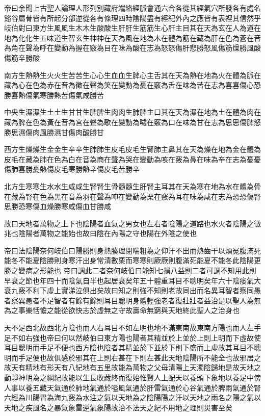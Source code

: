 帝曰余聞上古聖人論理人形列別藏府端絡經脈會通六合各從其經氣穴所發各有處名谿谷屬骨皆有所起分部逆從各有條理四時陰陽盡有經紀外內之應皆有表裡其信然乎
岐伯對曰東方生風風生木木生酸酸生肝肝生筋筋生心肝主目其在天為玄在人為道在地為化化生五味道生智玄生神神在天為風在地為木在體為筋在藏為肝在色為蒼在音為角在聲為呼在變動為握在竅為目在味為酸在志為怒怒傷肝悲勝怒風傷筋燥勝風酸傷筋辛勝酸

南方生熱熱生火火生苦苦生心心生血血生脾心主舌其在天為熱在地為火在體為脈在藏為心在色為赤在音為徵在聲為笑在變動為憂在竅為舌在味為苦在志為喜喜傷心恐勝喜熱傷氣寒勝熱苦傷氣咸勝苦

中央生濕濕生土土生甘甘生脾脾生肉肉生肺脾主口其在天為濕在地為土在體為肉在藏為脾在色為黃在音為宮在聲為歌在變動為噦在竅為口在味為甘在志為思思傷脾怒勝思濕傷肉風勝濕甘傷肉酸勝甘

西方生燥燥生金金生辛辛生肺肺生皮毛皮毛生腎肺主鼻其在天為燥在地為金在體為皮毛在藏為肺在色為白在音為商在聲為哭在變動為咳在竅為鼻在味為辛在志為憂憂傷肺喜勝憂熱傷皮毛寒勝熱辛傷皮毛苦勝辛

北方生寒寒生水水生咸咸生腎腎生骨髓髓生肝腎主耳其在天為寒在地為水在體為骨在藏為腎在色為黑在音為羽在聲為呻在變動為栗在竅為耳在味為咸在志為恐恐傷腎思勝恐寒傷血燥勝寒咸傷血甘勝咸

故曰天地者萬物之上下也陰陽者血氣之男女也左右者陰陽之道路也水火者陰陽之徵兆也陰陽者萬物之能始也故曰陰在內陽之守也陽在外陰之使也

帝曰法陰陽奈何岐伯曰陽勝則身熱腠理閉喘粗為之仰汗不出而熱齒干以煩冤腹滿死能冬不能夏陰勝則身寒汗出身常清數栗而寒寒則厥厥則腹滿死能夏不能冬此陰陽更勝之變病之形能也
帝曰調此二者奈何岐伯曰能知七損八益則二者可調不知用此則早衰之節也年四十而陰氣自半也起居衰矣年五十體重耳目不聰明矣年六十陰痿氣大衰九竅不利下虛上實涕泣俱出矣故曰知之則強不知則老故同出而名異耳智者察同愚者察異愚者不足智者有餘有餘則耳目聰明身體輕強老者復壯壯者益治是以聖人為無為之事樂恬憺之能從欲快志於虛無之守故壽命無窮與天地終此聖人之治身也

天不足西北故西北方陰也而人右耳目不如左明也地不滿東南故東南方陽也而人左手足不如右強也帝曰何以然岐伯曰東方陽也陽者其精並於上並於上則上明而下虛故使耳目聰明而手足不便也西方陰也陰者其精並於下並於下則下盛而上虛故其耳目不聰明而手足便也故俱感於邪其在上則右甚在下則左甚此天地陰陽所不能全也故邪居之
故天有精地有形天有八紀地有五里故能為萬物之父母清陽上天濁陰歸地是故天地之動靜神明為之綱紀故能以生長收藏終而復始惟賢人上配天以養頭下象地以養足中傍人事以養五藏天氣通於肺地氣通於嗌風氣通於肝雷氣通於心谷氣通於脾雨氣通於腎六經為川腸胃為海九竅為水注之氣以天地為之陰陽陽之汗以天地之雨名之陽之氣以天地之疾風名之暴氣象雷逆氣象陽故治不法天之紀不用地之理則災害至矣

